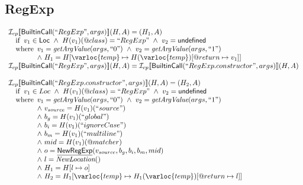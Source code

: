 \subsection{RegExp}
\[
\begin{array}{l}
\I_{cp}\lbr \SF{BuiltinCall}(``RegExp", args)\rbr(H,A)
= (H_1, A)\\
\quad\ifc{
  v_{1} \in \SF{Loc} ~\land~ H(v_{1})(\varprop{class}) = ``RegExp" ~\land~ v_2 = \SF{undefined}
}\\
\quad\wherec{
  v_{1} = \hf{getArgValue}(args, ``0") ~\land~  v_{2} = \hf{getArgValue}(args, ``1") \\
  \land~ H_1 = H[\varloc{temp}\mapsto H(\varloc{temp})[\varprop{return}\mapsto v_{1}]]
}\\

\I_{cp}\lbr \SF{BuiltinCall}(``RegExp", args)\rbr(H,A)
= \I_{cp}\lbr \SF{BuiltinCall}(``RegExp.constructor", args)\rbr(H,A)
\\\\

\I_{cp}\lbr \SF{BuiltinCall}(``RegExp.constructor", args)\rbr(H,A)
= (H_2, A)\\
\quad\ifc{
  v_{1} \in Loc ~\land~ H(v_{1})(\varprop{class}) = ``RegExp" ~\land~ v_{2} = \SF{undefined}
}\\
\quad\wherec{
  v_{1} = \hf{getArgValue}(args, ``0") ~\land~  v_{2} = \hf{getArgValue}(args, ``1")\\
  \land~ v_{source} = H(v_{1})(``source") \\
  \land~ b_{g} = H(v_{1})(``global")\\
  \land~ b_{i} = H(v_{1})(``ignoreCase")\\
  \land~ b_{m} = H(v_{1})(``multiline")\\
  \land~ mid = H(v_{1})(\varprop{matcher})\\
  \land~ o = \chf{NewRegExp}(v_{source}, b_{g}, b_{i}, b_{m}, mid)\\
  \land~ l=\hf{NewLocation}()\\
  \land~ H_1 = H[l\mapsto o]\\
  \land~ H_2 = H_1[\varloc{temp}\mapsto H_1(\varloc{temp})[\varprop{return}\mapsto l]]
}\\


\end{array}\]
